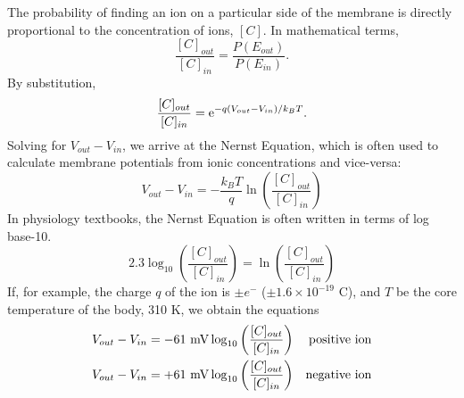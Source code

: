 The probability of finding an ion on a particular side of the membrane is directly proportional to the concentration of ions, $[C]$.  In mathematical terms, $$\frac{[C]_{out}}{[C]_{in}}=\frac{P\left(E_{out}\right)}{P\left(E_{in}\right)}.$$  By substitution, $$\frac{[C]_{out}}{[C]_{in}}={\rm e}^{-q\left(V_{out}-V_{in}\right)/k_BT}.$$  Solving for $V_{out}-V_{in}$, we arrive at the Nernst Equation, which is often used to calculate membrane potentials from ionic concentrations and vice-versa:
\begin{equation}\label{eqn8-5}
V_{out}-V_{in}=-\frac{k_BT}{q}\ln\left(\frac{[C]_{out}}{[C]_{in}}\right)
\end{equation} 
In physiology textbooks, the Nernst Equation is often written in terms of log base-10. $$2.3\log_{10}\left(\frac{[C]_{out}}{[C]_{in}}\right) = \ln\left(\frac{[C]_{out}}{[C]_{in}}\right)$$ If, for example, the charge $q$ of the ion is $\pm e^-$ ($\pm1.6\times10^{-19}$ C), and $T$ be the core temperature of the body, 310 K, we obtain the equations 
\begin{align}\label{eqn8-6}
V_{out}-V_{in}  &=  - 61~{\rm mV}\log_{10}\left(\frac{[C]_{out}}{[C]_{in}}\right)   & {\rm positive~ion}\\
V_{out}-V_{in}  &=  + 61~{\rm mV}\log_{10}\left(\frac{[C]_{out}}{[C]_{in}}\right)   & {\rm negative~ion}                         
\end{align}

